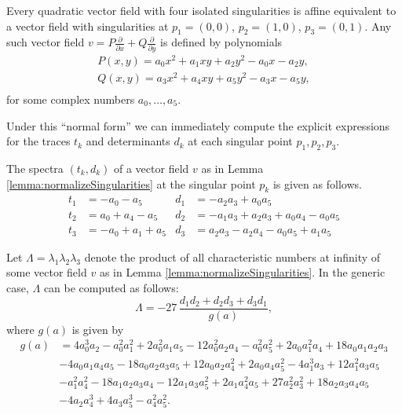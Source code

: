 \documentclass[phd,tocprelim]{cornell}
\begin{document}
\begin{lemma}\label{lemma:normalizeSingularities}
 Every quadratic vector field with four isolated singularities is affine equivalent to a vector field with singularities at $p_1=(0,0)$, $p_2=(1,0)$, $p_3=(0,1)$. Any such vector field $v=P\frac{\partial}{\partial x}+Q\frac{\partial}{\partial y}$ is defined by polynomials
\begin{equation}\label{eq:coefficients}
\begin{array}{l} 
 P(x,y) = a_0x^2+a_1xy+a_2y^2-a_0x-a_2y,  \\ 
 Q(x,y) = a_3x^2+a_4xy+a_5y^2-a_3x-a_5y, \\
\end{array}
\end{equation}
for some complex numbers $a_0,\ldots,a_5$.
\end{lemma}

Under this ``normal form'' we can immediately compute the explicit expressions for the traces $t_k$ and determinants $d_k$ at each singular point $p_1,p_2,p_3$.

\begin{lemma}\label{lemma:expressionsSpectra}
 The spectra $(t_k,d_k)$ of a vector field $v$ as in Lemma \ref{lemma:normalizeSingularities} at the singular point $p_k$ is given as follows.
 \begin{align*}
  t_1 &= -a_0-a_5  	& d_1 &= -a_2a_3+a_0a_5 \\
  t_2 &= a_0+a_4-a_5  	& d_2 &= -a_1a_3+a_2a_3+a_0a_4-a_0a_5 \\
  t_3 &= -a_0+a_1+a_5  	& d_3 &= a_2a_3-a_2a_4-a_0a_5+a_1a_5 
 \end{align*}
\end{lemma}

\begin{lemma}\label{lemma:expressionLambda}
 Let $\Lambda=\lambda_1\lambda_2\lambda_3$ denote the product of all characteristic numbers at infinity of some vector field $v$ as in Lemma \ref{lemma:normalizeSingularities}. In the generic case, $\Lambda$ can be computed as follows:
 \begin{equation}\label{eq:expressionLambda}
  \Lambda = -27\,\frac{d_1d_2+d_2d_3+d_3d_1}{g(a)},
 \end{equation}
 where $g(a)$ is given by
 \begin{align*}
  g(a) &= 4a_0^3a_2-a_0^2a_1^2+2a_0^2a_1a_5-12a_0^2a_2a_4-a_0^2a_5^2+2a_0a_1^2a_4+18a_0a_1a_2a_3 \\
  & -4a_0a_1a_4a_5-18a_0a_2a_3a_5+12a_0a_2a_4^2+2a_0a_4a_5^2-4a_1^3a_3+12a_1^2a_3a_5 \\
  & -a_1^2a_4^2-18a_1a_2a_3a_4-12a_1a_3a_5^2+2a_1a_4^2a_5+27a_2^2a_3^2+18a_2a_3a_4a_5 \\
  & -4a_2a_4^3+4a_3a_5^3-a_4^2a_5^2.
 \end{align*}
\end{lemma}
\end{document}
